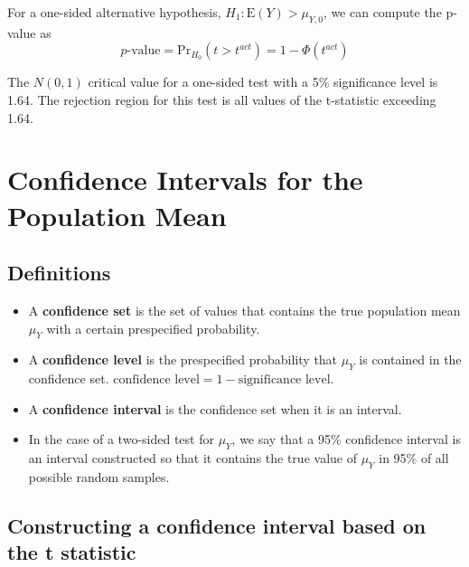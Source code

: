\documentclass[a4paper,11pt]{article}
\begin{document}
For a one-sided alternative hypothesis, \(H_1: \mathrm{E}(Y) >
\mu_{Y,0}\), we can compute the p-value as
\[ p\text{-value} = \mathrm{Pr}_{H_0}(t > t^{act}) = 1 - \Phi(t^{act}) \]

The \(N(0, 1)\) critical value for a one-sided test with a 5\%
significance level is 1.64. The rejection region for this test is all
values of the t-statistic exceeding 1.64. 


\section{Confidence Intervals for the Population Mean}
\label{sec:org88122a3}

\subsection{Definitions}
\label{sec:org1f34945}

\begin{itemize}
\item A \textbf{confidence set} is the set of values that contains the true
population mean \(\mu_Y\) with a certain prespecified probability.

\item A \textbf{confidence level} is the prespecified probability that \(\mu_Y\) is
contained in the confidence set. \(\text{confidence level} = 1 -
  \text{significance level}\).

\item A \textbf{confidence interval} is the confidence set when it is an
interval.

\item In the case of a two-sided test for \(\mu_Y\), we say that a 95\%
confidence interval is an interval constructed so that it contains
the true value of \(\mu_Y\) in 95\% of all possible random samples.
\end{itemize}

\subsection{Constructing a confidence interval based on the t statistic}
\label{sec:org76e9eee}
\end{document}
